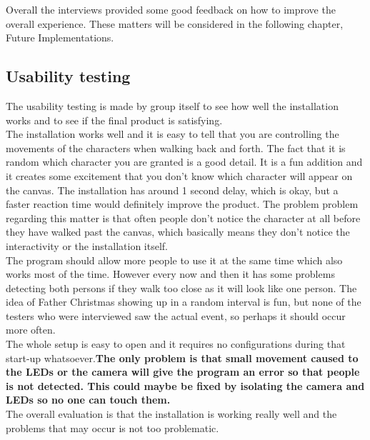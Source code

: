 Overall the interviews provided some good feedback on how to improve the overall experience. These matters will be considered in the following chapter, Future Implementations.

\subsection{Usability testing}

The usability testing is made by group itself to see how well the installation works and to see if the final product is satisfying.\\
The installation works well and it is easy to tell that you are controlling the movements of the characters when walking back and forth. The fact that it is random which character you are granted is a good detail. It is a fun addition and it creates some excitement that you don't know which character will appear on the canvas. The installation has around 1 second delay, which is okay, but a faster reaction time would definitely improve the product. The problem problem regarding this matter is that often people don't notice the character at all before they have walked past the canvas, which basically means they don't notice the interactivity or the installation itself. \\
The program should allow more people to use it at the same time which also works most of the time. However every now and then it has some problems detecting both persons if they walk too close as it will look like one person.
The idea of Father Christmas showing up in a random interval is fun, but none of the testers who were interviewed saw the actual event, so perhaps it should occur more often.\\
The whole setup is easy to open and it requires no configurations during that start-up whatsoever.\textbf{The only problem is that small movement caused to the LEDs or the camera will give the program an error so that people is not detected. This could maybe be fixed by isolating the camera and LEDs so no one can touch them.}\\
The overall evaluation is that the installation is working really well and the problems that may occur is not too problematic. 

